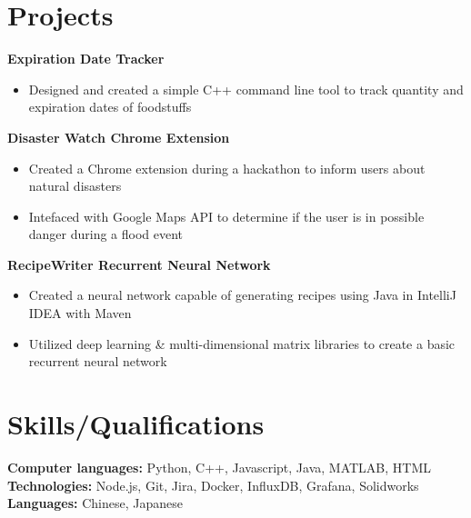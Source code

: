 \documentclass[letterpaper,11pt]{article}
\begin{document}
\section{Projects}
\textbf{Expiration Date Tracker}\\
\begin{itemize}[noitemsep, topsep=0pt, leftmargin=0.7cm]
  \item Designed and created a simple C++ command line tool to track quantity and expiration dates of foodstuffs
\end{itemize}
\textbf{Disaster Watch Chrome Extension}\\
\begin{itemize}[noitemsep, topsep=0pt, leftmargin=0.7cm]
  \item Created a Chrome extension during a hackathon to inform users about natural disasters
  \item Intefaced with Google Maps API to determine if the user is in possible danger during a flood event
\end{itemize}
\textbf{RecipeWriter Recurrent Neural Network}\\
\begin{itemize}[noitemsep, topsep=0pt, leftmargin=0.7cm]
  \item Created a neural network capable of generating recipes using Java in IntelliJ IDEA with Maven
  \item Utilized deep learning \& multi-dimensional matrix libraries to create a basic recurrent neural network
\end{itemize}

\section{Skills/Qualifications}
\textbf{Computer languages:} Python, C++, Javascript, Java, MATLAB, HTML\\
\textbf{Technologies:} Node.js, Git, Jira, Docker, InfluxDB, Grafana, Solidworks\\
\textbf{Languages:} Chinese, Japanese\\
\end{document}
